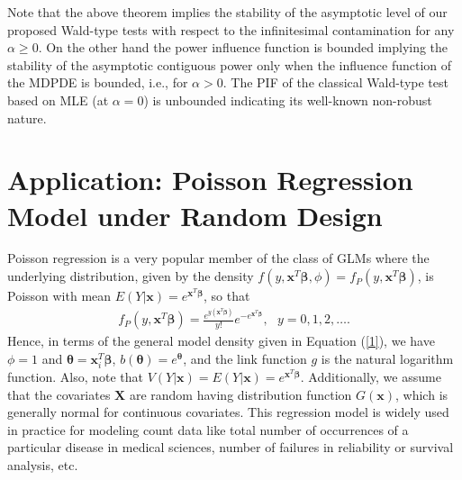 \documentclass[a4paper]{article}%
\begin{document}
Note that the above theorem implies the stability of the asymptotic level of
our proposed Wald-type tests with respect to the infinitesimal contamination for any
$\alpha\geq0$. On the other hand the power influence function is bounded
implying the stability of the asymptotic contiguous power only when the
influence function of the MDPDE is bounded, i.e., for $\alpha>0$. The PIF of
the classical Wald-type test based on MLE (at $\alpha=0$) is unbounded
indicating its well-known non-robust nature.

\section{Application: Poisson Regression Model under Random Design\label{sec5}%
}

Poisson regression is a very popular member of the class of GLMs where the underlying
distribution, given by the density $f(y,\boldsymbol{x}^{T}\boldsymbol{\beta},\phi)=f_{P}%
(y,\boldsymbol{x}^{T}\boldsymbol{\beta})$, is  Poisson with mean
$E(Y|\boldsymbol{x}) = e^{\boldsymbol{x}^{T}\boldsymbol{\beta}}$,
so that
\begin{align}
f_{P}(y,\boldsymbol{x}^{T}\boldsymbol{\beta}) = \frac{e^{y(\boldsymbol{x}%
^{T}\boldsymbol{\beta})}}{y!}e^{-e^{\boldsymbol{x}^{T}\boldsymbol{\beta}}},
~~~y=0,1,2, \ldots.\nonumber
\end{align}
Hence, in terms of the general model density given in Equation (\ref{1}), we have $\phi=1$ and $\boldsymbol{\theta
}= \boldsymbol{x}_{i}^{T}\boldsymbol{\beta}$, $b(\boldsymbol{\theta}) =
e^{\boldsymbol{\theta}}$, 
and the link function $g$ is the natural logarithm function.
Also, note that $V(Y|\boldsymbol{x}) = E(Y|\boldsymbol{x}) = e^{\boldsymbol{x}%
^{T}\boldsymbol{\beta}}$. Additionally, we assume that the covariates
$\boldsymbol{X}$ are random having distribution function $G(\boldsymbol{x})$, which is
generally normal for continuous covariates. This regression model is widely
used in practice for modeling count data like total number of occurrences of a
particular disease in medical sciences, number of failures in reliability or
survival analysis, etc.
\end{document}
